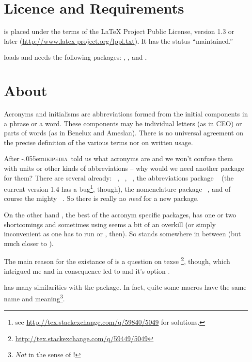 \documentclass[DIV10,toc=index,toc=bib]{cnpkgdoc}
\newcommand*\wikipedia{\libertineGlyph{W.alt}\kern-.055em\textsc{ikipedia}}
\begin{document}
\newpage
\section{Licence and Requirements}
\acro is placed under the terms of the LaTeX Project Public License,
version 1.3 or later (\url{http://www.latex-project.org/lppl.txt}).
It has the status ``maintained.''

\acro loads and needs the following packages: ,
,  and .

\section{About}
\begin{zitat}
 Acronyms and initialisms are abbreviations formed from the initial components
 in a phrase or a word. These components may be individual letters (as in CEO)
 or parts of words (as in Benelux and Ameslan). There is no universal agreement
 on the precise definition of the various terms nor on written usage.
\end{zitat}
After \wikipedia\ told us what acronyms are and we won't confuse them with units
or other kinds of abbreviations -- why would we need another package for them?
There are several already: ~\cite{acronym}, %
~\cite{acromake}, ~\cite{acroterm}, the abbreviations package
~\cite{abbrevs} (the current version 1.4 has a bug\footnote{see
\url{http://tex.stackexchange.com/q/59840/5049} for solutions.}, though), the
nomenclature package ~\cite{nomencl}, and of course the mighty
~\cite{glossaries}. So there is really no \emph{need} for a
new package.

On the other hand , the best of the acronym specific packages,
has one or two shortcomings and sometimes using  seems a bit
of an overkill (or simply inconvenient as one has to run 
or , then). So \acro stands somewhere in between (but much
closer to ).

The main reason for the existance of \acro is a question on \acs{texse}%
\footnote{\url{http://tex.stackexchange.com/q/59449/5049}}, though, which intrigued
me and in consequence led to \acro and it's option .

\acro has many similarities with the  package. In fact, quite
some macros have the same name and meaning\footnote{\emph{Not} in the sense of
\code{\textbackslash\textcolor{code}{meaning}}!}.
\end{document}
